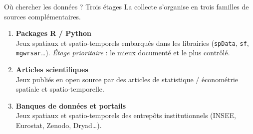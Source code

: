 \documentclass[aspectratio=169,11pt]{beamer}
\begin{document}
\begin{frame}{Où chercher les données ? Trois étages}
\small
La collecte s'organise en trois familles de sources complémentaires.
\vspace{0.3cm}
\begin{enumerate}
    \item \textbf{Packages R / Python} \\
    {\footnotesize Jeux spatiaux et spatio-temporels embarqués dans les librairies (\texttt{spData}, \texttt{sf}, \texttt{mgwrsar}\dots). \emph{Étage prioritaire} : le mieux documenté et le plus contrôlé.}
    \vspace{0.2cm}
    \item \textbf{Articles scientifiques} \\
    {\footnotesize Jeux publiés en open source par des articles de statistique / économétrie spatiale et spatio-temporelle.}
    \vspace{0.2cm}
    \item \textbf{Banques de données et portails} \\
    {\footnotesize Jeux spatiaux et spatio-temporels des entrepôts institutionnels (INSEE, Eurostat, Zenodo, Dryad\dots).}
\end{enumerate}
\end{frame}

\end{document}
